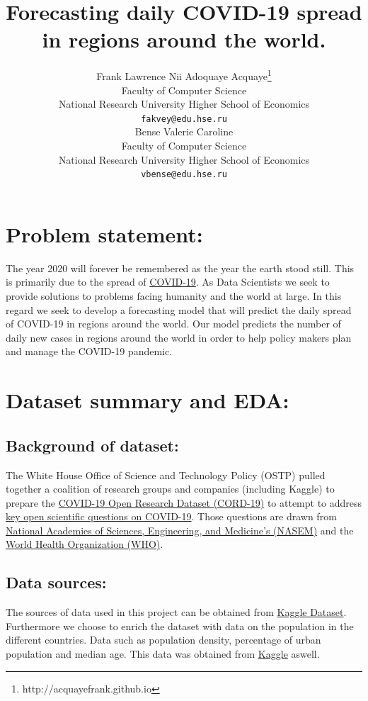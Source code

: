 \documentclass{article}
\title{Forecasting daily COVID-19 spread in regions around the world.}
\author{%
  Frank Lawrence Nii Adoquaye Acquaye\thanks{http://acquayefrank.github.io} \\
  Faculty of Computer Science\\
  National Research University Higher School of Economics\\
  \texttt{fakvey@edu.hse.ru} \\
  \And
  Bense Valerie Caroline \\
  Faculty of Computer Science\\
  National Research University Higher School of Economics\\
   \texttt{vbense@edu.hse.ru} \\
}
\begin{document}
\maketitle

\begin{abstract}

\end{abstract}

\section{Problem statement:}
The year 2020 will forever be remembered as the year the earth stood still. This is  primarily due to the spread of \href{https://en.wikipedia.org/wiki/Coronavirus_disease_2019}{COVID-19}. As Data Scientists we seek to provide solutions to problems facing humanity and the world at large. In this regard we seek to develop a forecasting model that will predict the daily spread of COVID-19 in regions around the world.  Our model predicts the number of daily new cases in regions around the world in order to help policy makers plan and manage the COVID-19 pandemic.  

\section{Dataset summary and EDA:}

\subsection{Background of dataset:}
The White House Office of Science and Technology Policy (OSTP) pulled together a coalition of research groups and companies (including Kaggle) to prepare the \href{https://www.kaggle.com/allen-institute-for-ai/CORD-19-research-challenge}{COVID-19 Open Research Dataset (CORD-19)} to attempt to address \href{https://www.kaggle.com/allen-institute-for-ai/CORD-19-research-challenge/tasks}{key open scientific questions on COVID-19}. Those questions are drawn from \href{https://www.nationalacademies.org/event/03-11-2020/standing-committee-on-emerging-infectious-diseases-and-21st-century-health-threats-virtual-meeting-1}{National Academies of Sciences, Engineering, and Medicine’s (NASEM)} and the \href{https://www.who.int/blueprint/priority-diseases/key-action/Global_Research_Forum_FINAL_VERSION_for_web_14_feb_2020.pdf?ua=1}{World Health Organization (WHO)}.

\subsection{Data sources:}
The sources of data used in this project can be obtained from \href{https://www.kaggle.com/c/covid19-global-forecasting-week-5/overview}{Kaggle Dataset}.
Furthermore we choose to enrich the dataset with data on the population in the different countries. Data such as population density, percentage of urban population and median age.
This data was obtained from \href{https://www.kaggle.com/tanuprabhu/population-by-country-2020}{Kaggle} aswell. 
\end{document}
